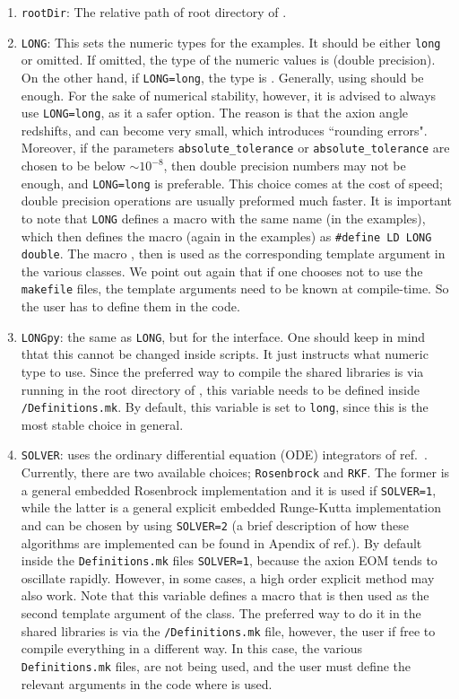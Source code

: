 \documentclass[11pt,a4paper]{article}
\begin{document}
\begin{enumerate}
	\item {\tt rootDir}: The relative path of root directory of \nsc.  
	\item {\tt LONG}: This sets the numeric types for the \CPP examples. It should be either {\tt long} or omitted. If omitted, the type of the numeric values is  (double precision). On the other hand, if {\tt LONG=long},  the type is  . Generally, using  should be enough. For the sake of numerical stability, however, it is advised to always use {\tt LONG=long}, as it a safer option. The reason is that the axion angle redshifts, and can become very small, which introduces ``rounding errors". Moreover, if the parameters {\tt absolute\_tolerance} or {\tt absolute\_tolerance} are chosen to be below $\sim 10^{-8}$, then double precision numbers may not be enough, and {\tt LONG=long} is preferable.  This choice comes at the cost of speed; double precision operations are usually preformed much faster. It is important to note that {\tt LONG} defines a macro with the same name (in the \CPP examples), which then defines the macro (again in the \CPP examples) as {\tt \#define LD LONG double}. The macro , then is used as the corresponding template argument in the various classes. We point out again that if one chooses not to use the {\tt makefile} files, the template arguments need to be known at compile-time. So the user has to define them in the code. 
	\item {\tt LONGpy}: the same as {\tt LONG}, but for the \PY interface. One should keep in mind thtat this cannot be changed inside \PY scripts. It just instructs  what numeric type to use. Since the preferred way to compile the shared libraries is via running  in the root directory of \nsc, this variable needs to be defined inside  {\tt \nsc/Definitions.mk}. By default, this variable is set to {\tt long}, since this is the most stable choice in general.  
	\item {\tt SOLVER}: \nsc uses the ordinary differential equation (ODE) integrators of ref.~\cite{NaBBODES}. Currently, there are two available choices; {\tt Rosenbrock} and {\tt RKF}. The former is a general embedded Rosenbrock implementation and it is used if {\tt SOLVER=1}, while the latter is a general explicit embedded Runge-Kutta implementation and can be chosen by using {\tt SOLVER=2} (a brief description of how these algorithms are implemented can be found in Apendix of ref.\cite{Karamitros:2021nxi}). By default inside the {\tt Definitions.mk} files {\tt SOLVER=1}, because the axion EOM tends to oscillate rapidly. However, in some cases, a high order explicit method may also work. Note that this variable defines a macro that is then used as the second template argument of the  class. The preferred way to do it in the shared libraries is via the {\tt \nsc/Definitions.mk} file, however, the user if free to compile everything in a different way. In this case, the  various {\tt Definitions.mk} files, are not being used, and the user must define the relevant arguments in the code where \nsc is used.

\end{enumerate}
\end{document}
